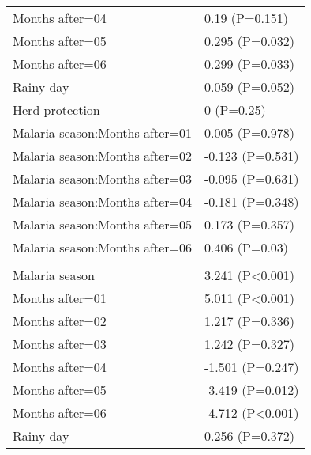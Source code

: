 \documentclass[]{article}
\begin{document}
\begin{longtable}[t]{ll}
\hspace{1em}Months after=04 & 0.19 (P=0.151)\\
\hspace{1em}Months after=05 & 0.295 (P=0.032)\\
\hspace{1em}Months after=06 & 0.299 (P=0.033)\\
\hspace{1em}Rainy day & 0.059 (P=0.052)\\
\hspace{1em}Herd protection & 0 (P=0.25)\\
\hspace{1em}Malaria season:Months after=01 & 0.005 (P=0.978)\\
\hspace{1em}Malaria season:Months after=02 & -0.123 (P=0.531)\\
\hspace{1em}Malaria season:Months after=03 & -0.095 (P=0.631)\\
\hspace{1em}Malaria season:Months after=04 & -0.181 (P=0.348)\\
\hspace{1em}Malaria season:Months after=05 & 0.173 (P=0.357)\\
\hspace{1em}Malaria season:Months after=06 & 0.406 (P=0.03)\\
\addlinespace[1.5em]
\multicolumn{2}{l}{\textbf{Temporary not field worker}}\\
\hspace{1em}Malaria season & 3.241 (P<0.001)\\
\hspace{1em}Months after=01 & 5.011 (P<0.001)\\
\hspace{1em}Months after=02 & 1.217 (P=0.336)\\
\hspace{1em}Months after=03 & 1.242 (P=0.327)\\
\hspace{1em}Months after=04 & -1.501 (P=0.247)\\
\hspace{1em}Months after=05 & -3.419 (P=0.012)\\
\hspace{1em}Months after=06 & -4.712 (P<0.001)\\
\hspace{1em}Rainy day & 0.256 (P=0.372)\\

\end{longtable}
\end{document}
